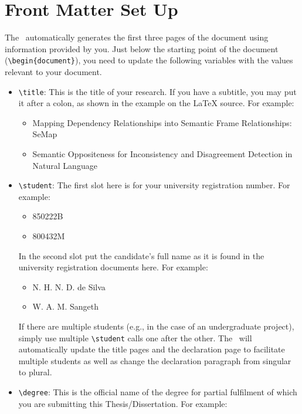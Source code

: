 \documentclass[12pt]{uomthesis}
\begin{document}
\section{Front Matter Set Up}
\label{Sec:Front}

The~\TheClass{} automatically generates the first three pages of the document using information provided by you. Just below the starting point of the document (\verb|\begin{document}|), you need to update the following variables with the values relevant to your document.


\begin{itemize}
    \item\verb|\title|: This is the title of your research. If you have a subtitle, you may put it after a colon, as shown in the example on the \LaTeX{} source. For example:\begin{itemize}[noitemsep,topsep=0pt]
           \item Mapping Dependency Relationships into Semantic Frame Relationships: SeMap
           \item Semantic Oppositeness for Inconsistency and Disagreement Detection in Natural Language
       \end{itemize}
    \item\verb|\student|: The first slot here is for your university registration number. For example:
       \begin{itemize}[noitemsep,topsep=0pt]
           \item 850222B
           \item 800432M
       \end{itemize}
     In the second slot put the candidate's full name as it is found in the university registration documents here. For example:\begin{itemize}[noitemsep,topsep=0pt]
           \item N. H. N. D. de Silva
           \item W. A. M. Sangeth
       \end{itemize}
       If there are multiple students (e.g., in the case of an undergraduate project), simply use multiple \verb|\student| calls one after the other. The~\TheClass{} will automatically update the title pages and the declaration page to facilitate multiple students as well as change the declaration paragraph from singular to plural.
    \item\verb|\degree|: This is the official name of the degree for partial fulfilment of which you are submitting this Thesis/Dissertation. For example:

\end{itemize}
\end{document}
